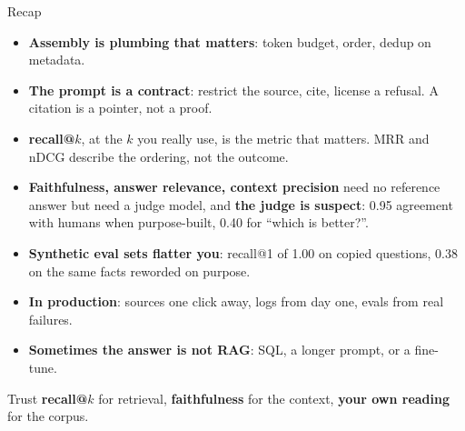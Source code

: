 \documentclass[aspectratio=169]{beamer}
\newcommand{\takebox}[1]{%
  \begin{tcolorbox}[colback=paramgreen!8, colframe=paramgreen, boxrule=0.6pt, arc=2pt]
  #1
  \end{tcolorbox}}
\begin{document}
\begin{frame}{Recap}
  \small
  \begin{itemize}\setlength{\itemsep}{1pt}
    \item \textbf{Assembly is plumbing that matters}: token budget, order, dedup on metadata.
    \item \textbf{The prompt is a contract}: restrict the source, cite, license a refusal.
      A citation is a pointer, not a proof.
    \item \textbf{recall@$k$}, at the $k$ you really use, is the metric that matters. MRR
      and nDCG describe the ordering, not the outcome.
    \item \textbf{Faithfulness, answer relevance, context precision} need no reference answer
      but need a judge model, and \textbf{the judge is suspect}: 0.95 agreement with humans
      when purpose-built, 0.40 for ``which is better?''.
    \item \textbf{Synthetic eval sets flatter you}: recall@1 of 1.00 on copied questions,
      0.38 on the same facts reworded on purpose.
    \item \textbf{In production}: sources one click away, logs from day one, evals from real failures.
    \item \textbf{Sometimes the answer is not RAG}: SQL, a longer prompt, or a fine-tune.
  \end{itemize}

  \takebox{\small Trust \textbf{recall@$k$} for retrieval, \textbf{faithfulness} for the context,
  \textbf{your own reading} for the corpus.}
\end{frame}
\end{document}
